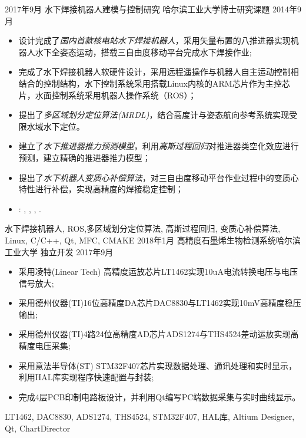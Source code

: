%
%


 
\begin{experiences}
			
 \experience
    {2017年9月} {水下焊接机器人建模与控制研究}{ 哈尔滨工业大学}{博士研究课题}
{2014年9月} {
          \begin{itemize}
          	\item 设计完成了\emph{国内首款核电站水下焊接机器人}，采用矢量布置的八推进器实现机器人水下全姿态运动，搭载三自由度移动平台完成水下焊接作业;
            \item 完成了水下焊接机器人软硬件设计，采用远程遥操作与机器人自主运动控制相结合的控制结构，水下控制系统采用搭载Linux内核的ARM芯片作为主控芯片，水面控制系统采用机器人操作系统（ROS）；
            \item 提出了\emph{多区域划分定位算法(MRDL)}，结合高度计与姿态航向参考系统实现受限水域水下定位。
            \item 建立了\emph{水下推进器推力预测模型}，利用\emph{高斯过程回归}对推进器类空化效应进行预测，建立精确的推进器推力模型；
            \item 提出了\emph{水下机器人变质心补偿算法}，对三自由度移动平台作业过程中的变质心特性进行补偿，实现高精度的焊接稳定控制；
            \item \faGithub: 
            , 
            ,
            ,
            . 
                
          \end{itemize}
        }
        {水下焊接机器人, ROS,多区域划分定位算法, 高斯过程回归, 变质心补偿算法, Linux, C/C++, Qt, MFC, CMAKE}
  \emptySeparator
  \experience
    {2018年1月} {高精度石墨烯生物检测系统}{哈尔滨工业大学}{ 独立开发}
    {2017年9月}    {
		\begin{itemize}
			\item 采用凌特(Linear Tech) 高精度运放芯片LT1462实现10uA电流转换电压与电压信号放大;
			\item 采用德州仪器(TI)16位高精度DA芯片DAC8830与LT1462实现10mV高精度稳压输出; 
			\item 采用德州仪器(TI)4路24位高精度AD芯片ADS1274与THS4524差动运放实现高精度电压采集;
			\item 采用意法半导体(ST) STM32F407芯片实现数据处理、通讯处理和实时显示，利用HAL库实现程序快速配置与封装;                    
			\item 完成4层PCB印制电路板设计，并利用Qt编写PC端数据采集与实时曲线显示。                                                                                  
		\end{itemize}
		}
		{LT1462, DAC8830, ADS1274, THS4524, STM32F407, HAL库, Altium Designer, Qt, ChartDirector}


\end{experiences}
